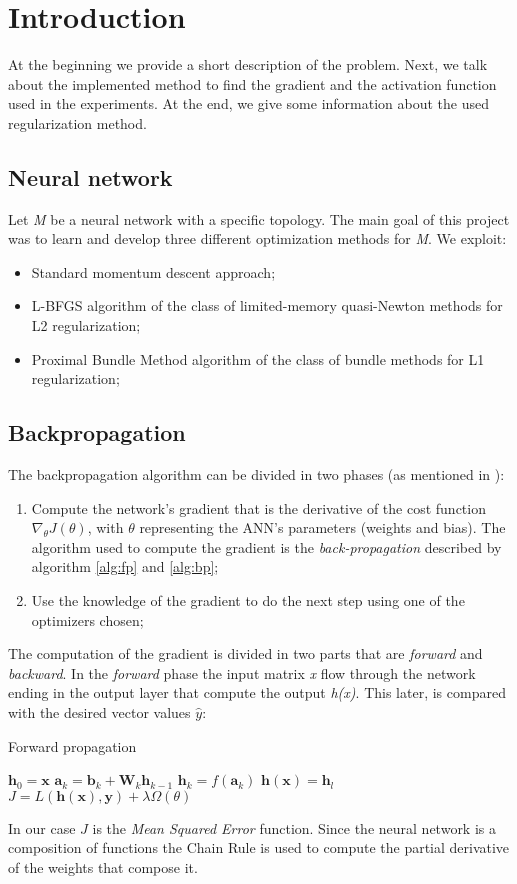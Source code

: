 \section{Introduction}
At the beginning we provide a short description of the problem. Next, we talk about the implemented method to find the gradient and the activation function used in the experiments. At the end, we give some information about the used regularization method.
\subsection{Neural network}
Let \textit{M} be a neural network with a specific topology. The main goal of this project was to learn and develop three different optimization methods for \textit{M}. We exploit:
\begin{itemize}
	\item Standard momentum descent approach;
	\item L-BFGS algorithm of the class of limited-memory quasi-Newton methods for L2 regularization;
	\item Proximal Bundle Method algorithm of the class of bundle methods for L1 regularization;
\end{itemize}
\subsection{Backpropagation}
The backpropagation algorithm can be divided in two phases (as mentioned in \cite{backpropagation}):
\begin{enumerate}
	\item Compute the network's gradient that is the derivative of the cost function
	$\nabla_{\theta} J(\theta)$, with $\theta$ representing the ANN's parameters (weights and bias). The algorithm used to compute the gradient is the \textit{back-propagation} described by
	algorithm \ref{alg:fp} and \ref{alg:bp};
	\item Use the knowledge of the gradient to do the next step using one of the optimizers chosen;
\end{enumerate}
The computation of the gradient is divided in two parts that are \textit{forward} and \textit{backward}. In the \textit{forward} phase the input matrix \textit{x} flow through the network ending in the output layer that compute the output \textit{h(x)}. This later, is compared with the desired vector values $\widehat{y}$:
\begin{algorithm}[H]
	\caption{Forward propagation}
	\label{alg:fp}
	\begin{algorithmic}[1]
		\State $\mathbf{h}_{0} = \mathbf{x}$
		\State $\mathbf{a}_{k} = \mathbf{b}_{k} + \mathbf{W}_{k}\mathbf{h}_{k - 1}$
		\State $\mathbf{h}_{k} = f(\mathbf{a}_{k})$
		\EndFor
		\State $\mathbf{h(x)} = \mathbf{h}_{l}$
		\State $J = L(\mathbf{h(x)}, \mathbf{y}) + \lambda \Omega(\theta)$
		\EndProcedure
	\end{algorithmic}
\end{algorithm}
In our case $J$ is the \textit{Mean Squared Error} function. Since the neural network is a composition of functions the Chain Rule is used to compute the partial derivative of the weights that compose it. 

